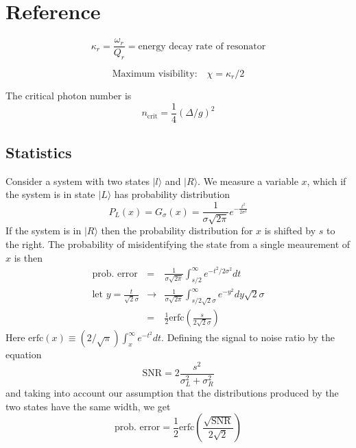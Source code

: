 \section{Reference}

\begin{equation}
\kappa_r = \frac{\omega_r}{Q_r} = \textrm{energy decay rate of resonator} \end{equation}

\begin{equation}
\text{Maximum visibility:}\quad \chi = \kappa_r / 2 \end{equation}

The critical photon number is \begin{equation}
n_{\textrm{crit}} = \frac{1}{4} \left( \Delta / g \right)^2 \end{equation}

\subsection{Statistics}

Consider a system with two states $|l\rangle$ and $|R\rangle$. We measure a variable $x$, which if the system is in state $|L\rangle$ has probability distribution \begin{equation}
P_L(x) = G_{\sigma}(x) = \frac{1}{\sigma\sqrt{2\pi}} e^{-\frac{t^2}{2\sigma^2}} \end{equation}
If the system is in $|R\rangle$ then the probability distribution for $x$ is shifted by $s$ to the right. The probability of misidentifying the state from a single meaurement of $x$ is then \begin{eqnarray}
\textrm{prob. error} &=& \frac{1}{\sigma\sqrt{2\pi}} \int_{s/2}^{\infty} e^{-t^2/2\sigma^2}dt \\
\textrm{let } y=\frac{t}{\sqrt{2}\sigma} &\rightarrow& \frac{1}{\sigma\sqrt{2\pi}}\int_{s/2\sqrt{2}\sigma} ^{\infty} e^{-y^2} dy\sqrt{2}\sigma \\
&=& \frac{1}{2} \textrm{erfc} \left( \frac{s}{2\sqrt{2}\sigma} \right) \end{eqnarray}
Here $\textrm{erfc}(x)\equiv (2/\sqrt{\pi}) \int_x^{\infty} e^{-t^2}dt$. Defining the signal to noise ratio by the equation \begin{equation}
\textrm{SNR} = 2 \frac{s^2}{\sigma_L^2 + \sigma_R^2} \end{equation}
and taking into account our assumption that the distributions produced by the two states have the same width, we get \begin{equation}
\textrm{prob. error} = \frac{1}{2} \textrm{erfc}\left( \frac{\sqrt{\textrm{SNR}}}{2\sqrt{2}} \right) \end{equation}

